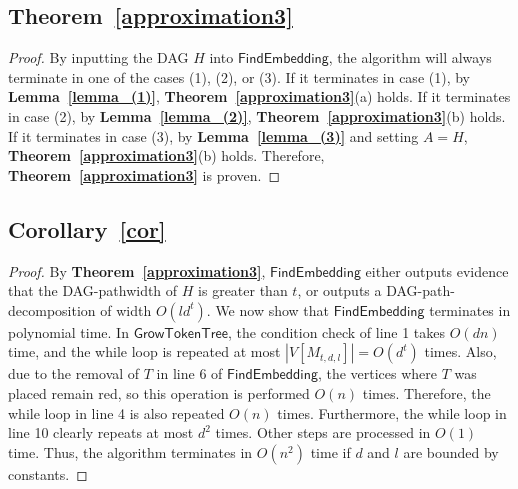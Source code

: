 \documentclass[runningheads]{llncs}
\theoremstyle{plain}
\theoremstyle{definition}
\begin{document}
\subsection{\textbf{Theorem~\ref{approximation3}}}\label{appendix_D8}
\begin{proof}
    By inputting the DAG $H$ into $\mathsf{FindEmbedding}$, the algorithm will always terminate in one of the cases (1), (2), or (3). If it terminates in case (1), by \textbf{Lemma~\ref{lemma_(1)}}, \textbf{Theorem~\ref{approximation3}}(a) holds. If it terminates in case (2), by \textbf{Lemma~\ref{lemma_(2)}}, \textbf{Theorem~\ref{approximation3}}(b) holds. If it terminates in case (3), by \textbf{Lemma~\ref{lemma_(3)}} and setting $A = H$, \textbf{Theorem~\ref{approximation3}}(b) holds. Therefore, \textbf{Theorem~\ref{approximation3}} is proven.
\end{proof}


\subsection{\textbf{Corollary~\ref{cor}}}\label{appendix_D9}
\begin{proof}
    By \textbf{Theorem~\ref{approximation3}}, $\mathsf{FindEmbedding}$ either outputs evidence that the DAG-pathwidth of $H$ is greater than $t$, or outputs a DAG-path-decomposition of width $O(ld^t)$. We now show that $\mathsf{FindEmbedding}$ terminates in polynomial time. In $\mathsf{GrowTokenTree}$, the condition check of line 1 takes $O(dn)$ time, and the while loop is repeated at most $|V[M_{t, d, l}]| = O(d^t)$ times. Also, due to the removal of $T$ in line 6 of $\mathsf{FindEmbedding}$, the vertices where $T$ was placed remain red, so this operation is performed $O(n)$ times. Therefore, the while loop in line 4 is also repeated $O(n)$ times. Furthermore, the while loop in line 10 clearly repeats at most $d^2$ times. Other steps are processed in $O(1)$ time. Thus, the algorithm terminates in $O(n^2)$ time if $d$ and $l$ are bounded by constants.
\end{proof}
\end{document}
